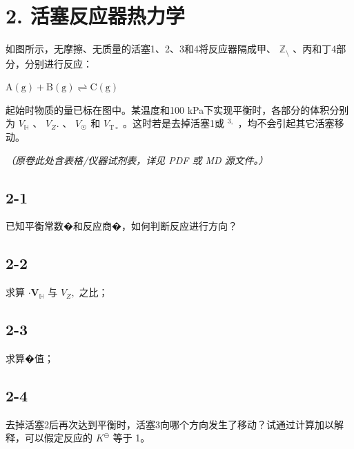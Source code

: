 \section*{2. 活塞反应器热力学}
如图所⽰，⽆摩擦、⽆质量的活塞1、2、3和4将反应器隔成甲、 $\mathbb { Z } _ { \setminus }$ 、丙和丁4部分，分别进⾏反应：

$
\mathrm{A} (\mathrm{g}) + \mathrm{B} (\mathrm{g}) \rightleftharpoons \mathrm{C} (\mathrm{g})
$

起始时物质的量已标在图中。某温度和100 kPa下实现平衡时，各部分的体积分别为 $V _ { \mathbb { H } }$ 、 $V _ { Z } .$ 、 $V _ { ☉ }$ 和 $V _ {  { \mathrm { T } } \circ }$ 。这时若是去掉活塞1或 $^ { 3 , }$ ，均不会引起其它活塞移动。

\textit{（原卷此处含表格/仪器试剂表，详见 PDF 或 MD 源文件。）}

\subsection*{2-1}
已知平衡常数�和反应商�，如何判断反应进⾏⽅向？

\subsection*{2-2}
求算 $\boldsymbol { { \cdot } } \boldsymbol { { V } } _ { \mathbb { H } }$ 与 $V _ { Z } ,$ 之⽐；

\subsection*{2-3}
求算�值；

\subsection*{2-4}
去掉活塞2后再次达到平衡时，活塞3向哪个⽅向发⽣了移动？试通过计算加以解释，可以假定反应的 $K ^ { \ominus }$ 等于 1。
